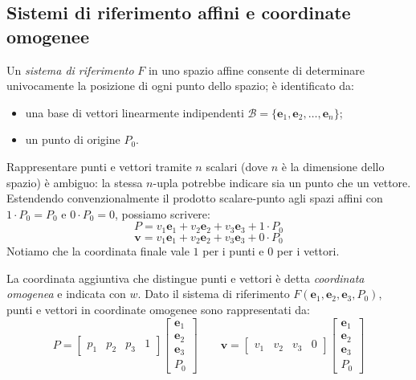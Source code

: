 \subsection{Sistemi di riferimento affini e coordinate omogenee}
\begin{definizione}
    Un \emph{sistema di riferimento} $F$ in uno spazio affine consente di determinare univocamente la posizione di ogni punto dello spazio; è identificato da:
    \begin{itemize}
        \item una base di vettori linearmente indipendenti $\mathcal{B} = \{\mathbf{e}_1, \mathbf{e}_2, \dots, \mathbf{e}_n\}$;
        \item un punto di origine $P_0$.
    \end{itemize}
\end{definizione}

\begin{osservazione}
    Rappresentare punti e vettori tramite $n$ scalari (dove $n$ è la dimensione dello spazio) è ambiguo: la stessa $n$-upla potrebbe indicare sia un punto che un vettore. Estendendo convenzionalmente il prodotto scalare-punto agli spazi affini con $1 \cdot P_0 = P_0$ e $0 \cdot P_0 = 0$, possiamo scrivere:
    \[
        P = v_1 \mathbf{e}_1 + v_2 \mathbf{e}_2 + v_3 \mathbf{e}_3 + 1 \cdot P_0
    \]
    \[
        \mathbf{v} = v_1 \mathbf{e}_1 + v_2 \mathbf{e}_2 + v_3 \mathbf{e}_3 + 0 \cdot P_0
    \]
    Notiamo che la coordinata finale vale $1$ per i punti e $0$ per i vettori.
\end{osservazione}

\begin{definizione}
    La coordinata aggiuntiva che distingue punti e vettori è detta \emph{coordinata omogenea} e indicata con $w$. Dato il sistema di riferimento $F (\mathbf{e}_1, \mathbf{e}_2, \mathbf{e}_3, P_0)$, punti e vettori in coordinate omogenee sono rappresentati da:
    \[
        P =
            \begin{bmatrix} p_1 & p_2 & p_3 & 1 \end{bmatrix}
            \begin{bmatrix} \mathbf{e}_1 \\ \mathbf{e}_2 \\ \mathbf{e}_3 \\ P_0 \end{bmatrix}
        \qquad
        \mathbf{v} =
            \begin{bmatrix} v_1 & v_2 & v_3 & 0 \end{bmatrix}
            \begin{bmatrix} \mathbf{e}_1 \\ \mathbf{e}_2 \\ \mathbf{e}_3 \\ P_0 \end{bmatrix}
    \]
\end{definizione}

